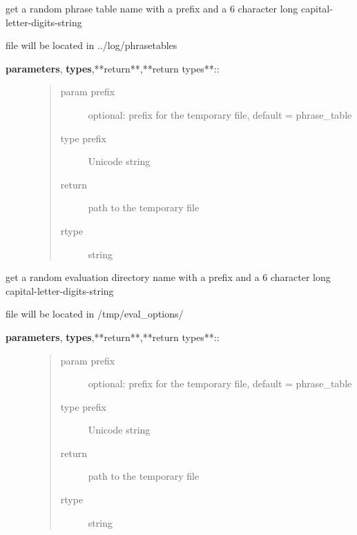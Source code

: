 \documentclass[letterpaper,10pt,english]{sphinxmanual}
\begin{document}
\begin{fulllineitems}
\label{API:norm.util.get_random_phrase_table_path}
get a random phrase table name with a prefix and a 6 character long capital-letter-digits-string

file will be located in ../log/phrasetables
\begin{description}
\item[{\textbf{parameters}, \textbf{types},**return**,**return types**::}] \leavevmode\begin{quote}\begin{description}
\item[{param prefix}] \leavevmode
optional: prefix for the temporary file, default = phrase\_table

\item[{type prefix}] \leavevmode
Unicode string

\item[{return}] \leavevmode
path to the temporary file

\item[{rtype}] \leavevmode
string

\end{description}\end{quote}

\end{description}

\end{fulllineitems}


\begin{fulllineitems}
\label{API:norm.util.get_random_tmp_eval_path}
get a random evaluation directory name with a prefix and a 6 character long capital-letter-digits-string

file will be located in /tmp/eval\_options/
\begin{description}
\item[{\textbf{parameters}, \textbf{types},**return**,**return types**::}] \leavevmode\begin{quote}\begin{description}
\item[{param prefix}] \leavevmode
optional: prefix for the temporary file, default = phrase\_table

\item[{type prefix}] \leavevmode
Unicode string

\item[{return}] \leavevmode
path to the temporary file

\item[{rtype}] \leavevmode
string

\end{description}\end{quote}

\end{description}

\end{fulllineitems}
\end{document}
